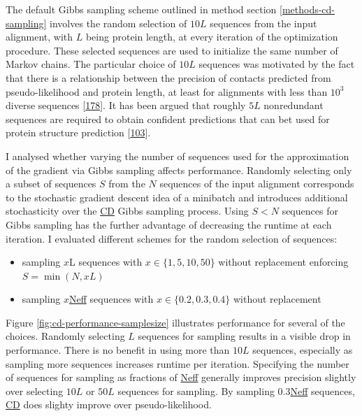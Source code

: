 \documentclass[11pt,a4paper,twoside]{book}
\providecommand{\tightlist}{%
  \setlength{\itemsep}{0pt}\setlength{\parskip}{0pt}}
\newcommand{\eq}{\!=\!}
\theoremstyle{definition}
\theoremstyle{definition}
\theoremstyle{remark}
\begin{document}
The default Gibbs sampling scheme outlined in method section
\ref{methods-cd-sampling} involves the random selection of \(10L\)
sequences from the input alignment, with \(L\) being protein length, at
every iteration of the optimization procedure. These selected sequences
are used to initialize the same number of Markov chains. The particular
choice of \(10L\) sequences was motivated by the fact that there is a
relationship between the precision of contacts predicted from
pseudo-likelihood and protein length, at least for alignments with less
than \(10^3\) diverse sequences
{[}\protect\hyperlink{ref-Anishchenko2017}{178}{]}. It has been argued
that roughly \(5L\) nonredundant sequences are required to obtain
confident predictions that can bet used for protein structure prediction
{[}\protect\hyperlink{ref-Kamisetty2013}{103}{]}.

I analysed whether varying the number of sequences used for the
approximation of the gradient via Gibbs sampling affects performance.
Randomly selecting only a subset of sequences \(S\) from the \(N\)
sequences of the input alignment corresponds to the stochastic gradient
descent idea of a minibatch and introduces additional stochasticity over
the \protect\hyperlink{abbrev}{CD} Gibbs sampling process. Using
\(S < N\) sequences for Gibbs sampling has the further advantage of
decreasing the runtime at each iteration. I evaluated different schemes
for the random selection of sequences:

\begin{itemize}
\tightlist
\item
  sampling \(x\)L sequences with \(x \in \{ 1, 5, 10, 50 \}\) without
  replacement enforcing \(S \eq \min(N, xL)\)
\item
  sampling \(x\)\protect\hyperlink{abbrev}{Neff} sequences with
  \(x \in \{ 0.2, 0.3, 0.4 \}\) without replacement
\end{itemize}

Figure \ref{fig:cd-performance-samplesize} illustrates performance for
several of the choices. Randomly selecting \(L\) sequences for sampling
results in a visible drop in performance. There is no benefit in using
more than \(10L\) sequences, especially as sampling more sequences
increases runtime per iteration. Specifying the number of sequences for
sampling as fractions of \protect\hyperlink{abbrev}{Neff} generally
improves precision slightly over selecting \(10L\) or \(50L\) sequences
for sampling. By sampling \(0.3\)\protect\hyperlink{abbrev}{Neff}
sequences, \protect\hyperlink{abbrev}{CD} does slighty improve over
pseudo-likelihood.
\end{document}
